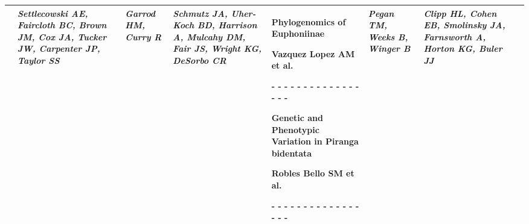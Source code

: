 \begin{tabular}{|x{0.8cm}|x{2.65cm}|x{2.65cm}|a{2.65cm}|y{2.65cm}|x{2.65cm}|x{2.65cm}|@{}m{0pt}@{}}
& \par \vspace{8pt} \textit{Settlecowski AE, Faircloth BC, Brown JM, Cox JA, Tucker JW, Carpenter JP, Taylor SS} &  \par \vspace{8pt} \textit{Garrod HM, Curry R} &  \par \vspace{8pt} \textit{Schmutz JA, Uher-Koch BD, Harrison A, Mulcahy DM, Fair JS, Wright KG, DeSorbo CR} & \scriptsize Phylogenomics of Euphoniinae\par \tiny Vazquez Lopez AM et al.\par - - - - - - - - - - - - - - - - - \par \vspace{2pt} \scriptsize Genetic and Phenotypic Variation in Piranga bidentata\par \tiny Robles Bello SM et al.\par - - - - - - - - - - - - - - - - - \par \vspace{2pt}  &  \par \vspace{8pt} \textit{Pegan TM, Weeks B, Winger B} &  \par \vspace{8pt} \textit{Clipp HL, Cohen EB, Smolinsky JA, Farnsworth A, Horton KG, Buler JJ}&\\[25ex]
\hline

\end{tabular}
